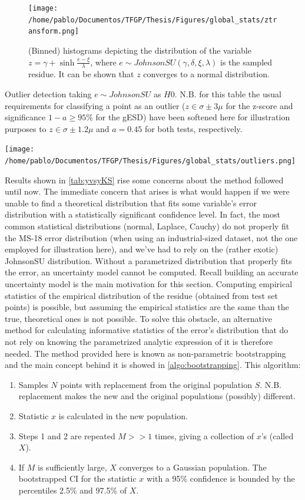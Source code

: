 \begin{figure}[!htb]
	\centering
	\texttt{[image: /home/pablo/Documentos/TFGP/Thesis/Figures/global\_stats/ztransform.png]}
	\caption{(Binned) histograms depicting the distribution of the variable $z=\gamma+\sinh{\frac{e-\xi}{\lambda}}$, where $e\sim JohnsonSU(\gamma,\delta,\xi,\lambda)$ is the sampled residue. It can be shown that $z$ converges to a normal distribution\cite{jones2009sinh}.}
	\label{fig:ztransform}
\end{figure}
%
\begin{table}[!htb]
	\centering
	\caption{Outlier detection taking $e\sim JohnsonSU$ as $H0$. N.B. for this table the usual requirements for classifying a point as an outlier ($z\in\sigma\pm3\mu$ for the z-score and significance $1-a\geq95\%$ for the gESD) have been softened here for illustration purposes to $z\in\sigma\pm1.2\mu$ and $a=0.45$ for both tests, respectively.}
	\texttt{[image: /home/pablo/Documentos/TFGP/Thesis/Figures/global\_stats/outliers.png]}
	\label{tab:outliers}
\end{table}
\indent Results shown in \autoref{tab:yvsyKS} rise some concerns about the method followed until now. The immediate concern that arises is what would happen if we were unable to find a theoretical distribution that fits some variable's error distribution with a statistically significant confidence level. In fact, the most common statistical distributions (normal, Laplace, Cauchy) do not properly fit the MS-18 error distribution (when using an industrial-sized dataset, not the one employed for illustration here), and we've had to rely on the (rather exotic) JohnsonSU distribution. Without a parametrized distribution that properly fits the error, an uncertainty model cannot be computed. Recall building an accurate uncertainty model is the main motivation for this section. Computing empirical statistics of the empirical distribution of the residue (obtained from test set points) is possible, but assuming the empirical statistics are the same than the true, theoretical ones is not possible. To solve this obstacle, an alternative method for calculating informative statistics of the error's distribution that do not rely on knowing the parametrized analytic expression of it is therefore needed. The method provided here is known as non-parametric bootstrapping\cite{efron1992bootstrap} and the main concept behind it is showed in \autoref{algo:bootstrapping}. This algorithm:
\begin{enumerate}
	\item Samples $N$ points with replacement from the original population $S$. N.B. replacement makes the new and the original populations (possibly) different.
	\item Statistic $x$ is calculated in the new population.
	\item Steps 1 and 2 are repeated $M>>1$ times, giving a collection of $x$'s (called $X$).
	\item If $M$ is sufficiently large, $X$ converges to a Gaussian population. The bootstrapped CI for the statistic $x$ with a 95\% confidence is bounded by the percentiles 2.5\% and 97.5\% of $X$.\\
\end{enumerate}
